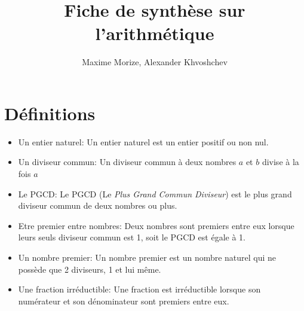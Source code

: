 \documentclass[14pt, letterpaper]{article}
\author{Maxime Morize, Alexander Khvoshchev}
\title{Fiche de synth\`ese sur l'arithm\'etique}
\begin{document}
\maketitle
\section{D\'efinitions}
\begin{itemize}
  \item{Un entier naturel:}
    Un entier naturel est un entier positif ou non nul.
  \item{Un diviseur commun:}
    Un diviseur commun \`a deux nombres \(a\) et \(b\) divise \`a la fois \(a\)
  \item{Le PGCD:}
    Le PGCD (Le\emph{ Plus Grand Commun Diviseur}) est le plus grand diviseur
    commun de deux nombres ou plus.
  \item{Etre premier entre nombres:}
    Deux nombres sont premiers entre eux lorsque leurs seuls diviseur commun est
    1, soit le PGCD est \'egale \`a 1.
  \item{Un nombre premier:}
    Un nombre premier est un nombre naturel qui ne poss\`ede que 2 diviseurs, 1
    et lui m\^eme.
  \item{Une fraction irr\'eductible:}
    Une fraction est irr\'eductible lorsque son num\'erateur et son
    d\'enominateur sont premiers entre eux.

\end{itemize}
\end{document}
